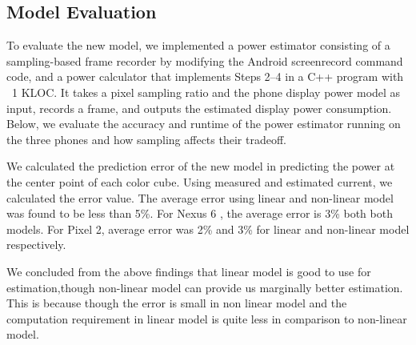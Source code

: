 \subsection{Model Evaluation}
\label{sec:evaluation}

To evaluate the new model,
we implemented a power estimator consisting of
a sampling-based frame recorder
by modifying the Android screenrecord command code,
and a power calculator that implements Steps 2--4 in a C++ program with ~1 KLOC.
It takes a pixel sampling ratio and the phone
display power model as input, records a frame,
and outputs the estimated display power consumption.
Below, we evaluate the accuracy and runtime of the
power estimator running on the three phones
and how sampling affects their tradeoff.


We calculated the prediction error of the new model
in predicting the power at the center point of each color cube.
Using measured and estimated current, we calculated the error value.
The average error using linear and non-linear model was found to be less
than 5\%. For Nexus 6 , the average error is  3\% both both models. For Pixel 2,
average error was 2\% and 3\% for linear and non-linear model respectively.

We concluded from the above findings that linear model is good to use for
estimation,though non-linear model can provide us marginally better estimation.
This is because though the error is small in non linear model 
and the computation requirement in linear model is quite less in comparison
to non-linear model.
\fi



